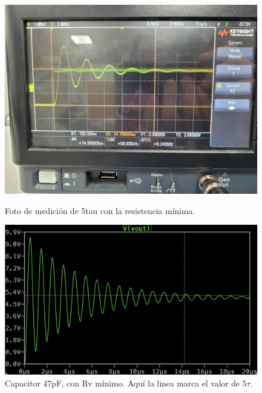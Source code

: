 \documentclass{article}
\begin{document}
        
                \begin{figure}[h!]
                    \centering
                    \begin{minipage}{0.49\textwidth}
                        \centering
                        \includegraphics[width=\linewidth]{OSI5T.jpg}
                        \caption{Foto de medición de 5tau con la resistencia mínima.}
                        \label{fig:taureal}
                    \end{minipage}\hfill
                    \begin{minipage}{0.49\textwidth}
                        \centering
                        \includegraphics[width=\linewidth]{TAU47PF.png}
                        \caption{Capacitor 47pF, con Rv mínimo. Aquí la linea marca el valor de 5$\tau$. }
                        \label{fig:tausim}
                    \end{minipage}
                \end{figure}
\end{document}

